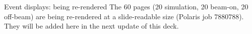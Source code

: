 \begin{frame}{Event displays: being re-rendered}
  \centering\footnotesize
  The 60 pages (20 simulation, 20 beam-on, 20 off-beam) are being re-rendered at a slide-readable size
  (Polaris job 7880788). They will be added here in the next update of this deck.
\end{frame}
